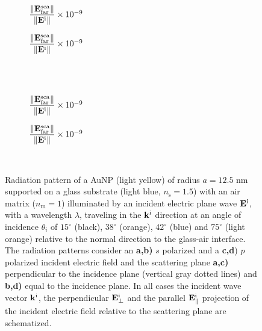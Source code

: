 \begin{figure}[t!]
    \centering
    \def\svgwidth{.8\textwidth}
    \hspace*{-.215\textwidth}%
    \vspace*{-.5em}%
        \begin{subfigure}{.32\textwidth}\caption{\footnotesize$\dfrac{\norm{\vb{E}^\text{sca}_\text{far}}}{\norm{\vb{E}^\text{i}}} \times 10^{-9}$  }\label{sfig:Far:SuppObl:s:a}\end{subfigure}%
        \begin{subfigure}{.4\textwidth}\caption{\footnotesize$\dfrac{\norm{\vb{E}^\text{sca}_\text{far}}}{\norm{\vb{E}^\text{i}}} \times 10^{-9}$  }\label{sfig:Far:SuppObl:s:b}\end{subfigure}\\
    \\
    \def\svgwidth{.8\textwidth}
    \hspace*{-.215\textwidth}%
    \vspace*{-.5em}%
        \begin{subfigure}{.32\textwidth}\caption{\footnotesize$\dfrac{\norm{\vb{E}^\text{sca}_\text{far}}}{\norm{\vb{E}^\text{i}}} \times 10^{-9}$  }\label{sfig:Far:SuppObl:p:c}\end{subfigure}%
        \begin{subfigure}{.4\textwidth}\caption{\footnotesize$\dfrac{\norm{\vb{E}^\text{sca}_\text{far}}}{\norm{\vb{E}^\text{i}}} \times 10^{-9}$  }\label{sfig:Far:SuppObl:p:d}\end{subfigure}\\
    \caption[  Radiation pattern of a AuNP supported on a substrate illuminated at oblique incidence]{Radiation pattern of a AuNP (light yellow) of radius $a = 12.5$ nm supported on a glass substrate (light blue, $n_\text{s} = 1.5$) with an air matrix ($n_\text{m} = 1$) illuminated by an incident electric plane wave $\vb{E}^\text{i}$, with a wavelength $\lambda$, traveling in the $\vb{k}^\text{i}$ direction at an angle of incidence $\theta_i$ of $15^\circ$ (black),  $38^\circ$ (orange),  $42^\circ$ (blue) and  $75^\circ$ (light orange) relative to the normal direction to the glass-air interface. The radiation patterns consider an \textbf{a,b)} $s$ polarized and  a \textbf{c,d}) $p$ polarized incident electric field and the scattering plane \textbf{a,c)} perpendicular to the incidence plane (vertical gray dotted lines) and \textbf{b,d)} equal to the incidence plane. In all cases the incident wave vector $\vb{k}^\text{i}$, the perpendicular $\vb{E}_\perp^\text{i}$ and the  parallel $\vb{E}_\parallel^\text{i}$ projection of the incident electric field relative to the scattering plane are schematized.%
    }
    \label{fig:Far:SuppObl}
\end{figure}

